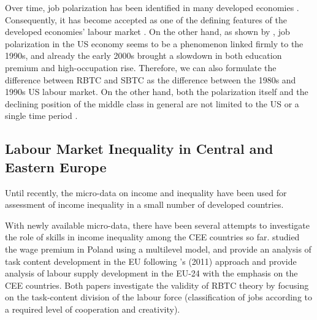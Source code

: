 \documentclass[11pt]{article}
\begin{document}

 Over time, job polarization has been identified in many developed economies \citep{rodrik2020economic, oecd2017}. Consequently, it has become accepted as one of the defining features of the developed economies' labour market \citep{howell2019declining}. On the other hand, as shown by \citet{mishel2013assessing}, job polarization in the US economy seems to be a phenomenon linked firmly to the 1990s, and already the early 2000s brought a slowdown in both education premium and high-occupation rise. Therefore, we can also formulate the difference between RBTC and SBTC as the difference between the 1980s and 1990s US labour market. On the other hand, both the polarization itself and the declining position of the middle class in general are not limited to the US or a single time period \citep{temin2018vanishing, rodrik2020economic}. %



\subsection{Labour Market Inequality in Central and Eastern Europe}
Until recently, the micro-data on income and inequality have been used for assessment of income inequality in a small number of developed countries.

With newly available micro-data, there have been several attempts to investigate the role of skills in income inequality among the CEE countries so far. \citet{arendt2019technical} studied the wage premium in Poland using a multilevel model, and \citet{hardy2018educational} provide an analysis of task content development in the EU following \citeauthor{acemoglu2011skills}'s (2011) approach and provide analysis of labour supply development in the EU-24 with the emphasis on the CEE countries. Both papers investigate the validity of RBTC theory by focusing on the task-content division of the labour force (classification of jobs according to a required level of cooperation and creativity).
\end{document}
